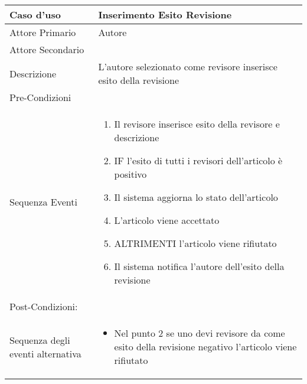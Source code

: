 \begin{tabular}{|p{3cm}|p{7cm}|}
\hline 
\rowcolor{Orchid}
Caso d'uso & Inserimento Esito Revisione\\
\hline
Attore Primario & Autore \\
\hline
Attore Secondario & \\
\hline
Descrizione & L'autore selezionato come revisore inserisce esito della revisione\\
\hline
Pre-Condizioni& \\
\hline
  Sequenza Eventi&
                   \begin{enumerate}
                   \item Il revisore inserisce esito della revisore e descrizione
                   \item IF l'esito di tutti i revisori dell'articolo è positivo
                   \item Il sistema aggiorna lo stato dell'articolo
                   \item L'articolo viene accettato
                   \item ALTRIMENTI l'articolo viene rifiutato
                   \item Il sistema notifica l'autore dell'esito della revisione
                   \end{enumerate}\\
\hline
Post-Condizioni: & \\
\hline
Sequenza degli eventi alternativa & \begin{itemize}
  \item Nel punto 2 se uno devi revisore da come esito della revisione negativo l'articolo viene rifiutato
\end{itemize} \\
\hline
\end{tabular}
